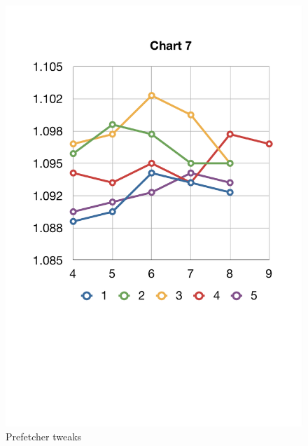 \begin{figure}
	\centering \includegraphics[scale=0.5]{img/prefetcher_tweaks.pdf}
	\caption{Prefetcher tweaks}
	\label{fig:prefetcher_tweaks}
\end{figure}
